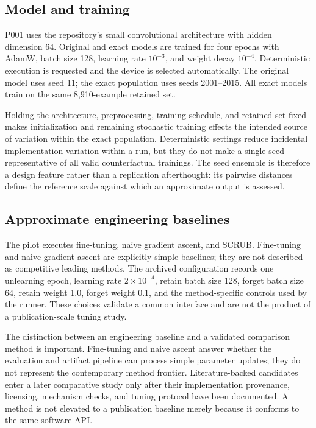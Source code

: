 \subsection{Model and training}
P001 uses the repository's small convolutional architecture with hidden dimension 64.
Original and exact models are trained for four epochs with AdamW, batch size 128, learning
rate $10^{-3}$, and weight decay $10^{-4}$. Deterministic execution is requested and the
device is selected automatically. The original model uses seed 11; the exact population
uses seeds 2001--2015. All exact models train on the same 8,910-example retained set.

Holding the architecture, preprocessing, training schedule, and retained set fixed makes
initialization and remaining stochastic training effects the intended source of variation
within the exact population. Deterministic settings reduce incidental implementation
variation within a run, but they do not make a single seed representative of all valid
counterfactual trainings. The seed ensemble is therefore a design feature rather than a
replication afterthought: its pairwise distances define the reference scale against which an
approximate output is assessed.

\subsection{Approximate engineering baselines}
The pilot executes fine-tuning, naive gradient ascent, and SCRUB. Fine-tuning and naive
gradient ascent are explicitly simple baselines; they are not described as competitive
leading methods. The archived configuration records one unlearning epoch,
learning rate $2\times10^{-4}$, retain batch size 128, forget batch size 64, retain weight
1.0, forget weight 0.1, and the method-specific controls used by the runner. These choices
validate a common interface and are not the product of a publication-scale tuning study.

The distinction between an engineering baseline and a validated comparison method is
important. Fine-tuning and naive ascent answer whether the evaluation and artifact pipeline
can process simple parameter updates; they do not represent the contemporary method
frontier. Literature-backed candidates enter a later comparative study only after their
implementation provenance, licensing, mechanism checks, and tuning protocol have been
documented. A method is not elevated to a publication baseline merely because it conforms to
the same software API.

